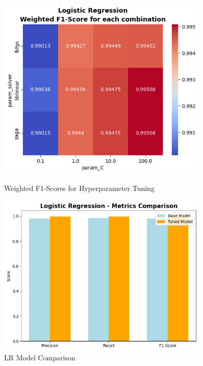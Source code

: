             \begin{figure}[h]
                \centering
                \begin{minipage}[c]{0.47\textwidth}
                    \centering
                    \includegraphics[width=0.9\textwidth]{../figures/plots/section2/weighted_f1_score_for_each_combination_of_parameters_logistic_regression.png}
                    \vspace{-0.15cm}
                    \caption{Weighted F1-Scores for Hyperparameter Tuning}
                    \label{fig:logistic_tuning}
                \end{minipage}
                \hfill
                \begin{minipage}[c]{0.47\textwidth}
                    \centering
                    \vspace{0.5cm}
                    \includegraphics[width=0.9\textwidth]{../figures/plots/section2/Logistic_Regression_Metric_comparison.png}
                    \caption{LR Model Comparison}
                    \label{fig:logistic_cm}
                \end{minipage}
            \end{figure}
    

